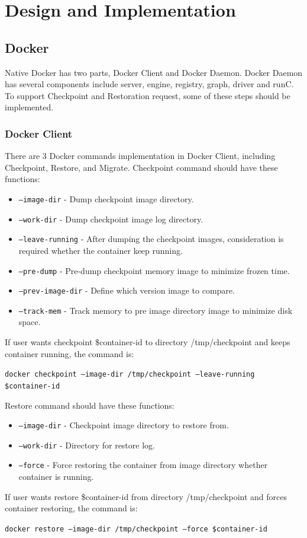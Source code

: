 \chapter{Design and Implementation}
\label{chap:design}
\section{Docker}
Native Docker has two parts, Docker Client and Docker Daemon. Docker Daemon has several components include server, engine, registry, graph, driver and runC. To support Checkpoint and Restoration request, some of these steps should be implemented.

\subsection{Docker Client}
There are 3 Docker commands implementation in Docker Client, including Checkpoint, Restore, and Migrate. Checkpoint command should have these functions:
\begin{itemize}
	\item \texttt{--image-dir} - Dump checkpoint image directory.
	\item \texttt{--work-dir} - Dump checkpoint image log directory.
	\item \texttt{--leave-running} - After dumping the checkpoint images, consideration is required whether the container keep running.
	\item \texttt{--pre-dump} - Pre-dump checkpoint memory image to minimize frozen time.
	\item \texttt{--prev-image-dir} - Define which version image to compare.
	\item \texttt{--track-mem} - Track memory to pre image directory image to minimize disk space.
\end{itemize}
If user wants checkpoint \$container-id to directory /tmp/checkpoint and keeps container running, the command is:
\begin{center}
\texttt{docker checkpoint --image-dir /tmp/checkpoint --leave-running \$container-id}
\end{center}

Restore command should have these functions:
\begin{itemize}
	\item \texttt{--image-dir} - Checkpoint image directory to restore from.
	\item \texttt{--work-dir} - Directory for restore log.
	\item \texttt{--force} - Force restoring the container from image directory whether container is running.
\end{itemize}
If user wants restore \$container-id from directory /tmp/checkpoint and forces container restoring, the command is:
\begin{center}
\texttt{docker restore --image-dir /tmp/checkpoint --force \$container-id}
\end{center}

